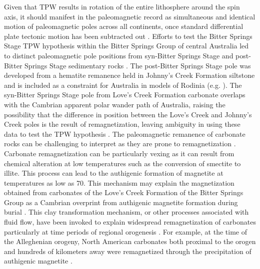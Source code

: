 Given that TPW results in rotation of the entire lithosphere around the spin axis, it should manifest in the paleomagnetic record as simultaneous and identical motion of paleomagnetic poles across all continents, once standard differential plate tectonic motion has been subtracted out \citep{Evans2003a}. Efforts to test the Bitter Springs Stage TPW hypothesis within the Bitter Springs Group of central Australia led to distinct paleomagnetic pole positions from syn-Bitter Springs Stage and post-Bitter Springs Stage sedimentary rocks \citep{Swanson-Hysell2012a}. The post-Bitter Springs Stage pole was developed from a hematite remanence held in Johnny's Creek Formation siltstone and is included as a constraint for Australia in models of Rodinia (e.g. \citealp{Merdith2017a}). The syn-Bitter Springs Stage pole from Love's Creek Formation carbonate overlaps with the Cambrian apparent polar wander path of Australia, raising the possibility that the difference in position between the Love's Creek and Johnny's Creek poles is the result of remagnetization, leaving ambiguity in using these data to test the TPW hypothesis \citep{Swanson-Hysell2012a}. The paleomagnetic remanence of carbonate rocks can be challenging to interpret as they are prone to remagnetization \citep{Van-Der-Voo2012a, Jackson2012a}. Carbonate remagnetization can be particularly vexing as it can result from chemical alteration at low temperatures such as the conversion of smectite to illite. This process can lead to the authigenic formation of magnetite at temperatures as low as 70\degreesC \citep{Katz1998a, Tohver2008a}. This mechanism may explain the magnetization obtained from carbonates of the Love's Creek Formation of the Bitter Springs Group as a Cambrian overprint from authigenic magnetite formation during burial \citep{Swanson-Hysell2012a}. This clay transformation mechanism, or other processes associated with fluid flow, have been invoked to explain widespread remagnetization of carbonates particularly at time periods of regional orogenesis \citep{Van-Der-Voo2012a}. For example, at the time of the Alleghenian orogeny, North American carbonates both proximal to the orogen and hundreds of kilometers away were remagnetized through the precipitation of authigenic magnetite \citep{McCabe1989a, Van-Der-Voo2012a}.


